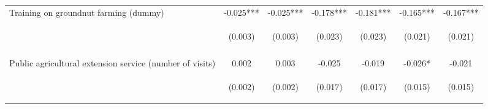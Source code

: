 \begin{center}
\begin{tabular}{lcccccc}
Training on groundnut farming (dummy) & -0.025*** & -0.025*** & -0.178*** & -0.181*** & -0.165*** & -0.167*** \\
 & \begin{footnotesize}(0.003)\end{footnotesize} & \begin{footnotesize}(0.003)\end{footnotesize} & \begin{footnotesize}(0.023)\end{footnotesize} & \begin{footnotesize}(0.023)\end{footnotesize} & \begin{footnotesize}(0.021)\end{footnotesize} & \begin{footnotesize}(0.021)\end{footnotesize} \\
\vspace{4pt} & \begin{footnotesize}[0.000]\end{footnotesize} & \begin{footnotesize}[0.000]\end{footnotesize} & \begin{footnotesize}[0.000]\end{footnotesize} & \begin{footnotesize}[0.000]\end{footnotesize} & \begin{footnotesize}[0.000]\end{footnotesize} & \begin{footnotesize}[0.000]\end{footnotesize} \\
Public agricultural extension service (number of visits) & 0.002 & 0.003 & -0.025 & -0.019 & -0.026* & -0.021 \\
 & \begin{footnotesize}(0.002)\end{footnotesize} & \begin{footnotesize}(0.002)\end{footnotesize} & \begin{footnotesize}(0.017)\end{footnotesize} & \begin{footnotesize}(0.017)\end{footnotesize} & \begin{footnotesize}(0.015)\end{footnotesize} & \begin{footnotesize}(0.015)\end{footnotesize} \\

\end{tabular}
\end{center}
